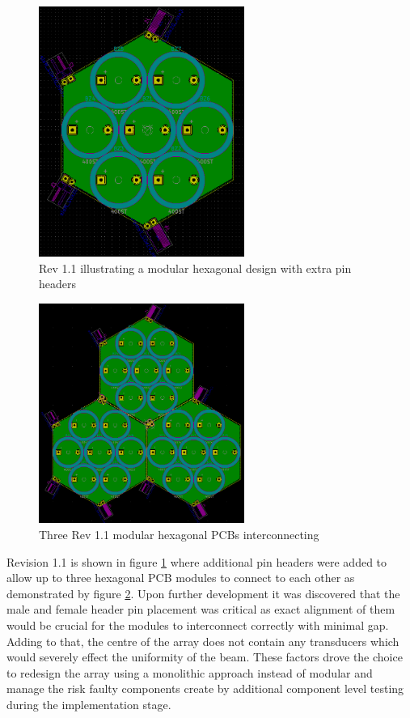 \begin{figure}[ht!]
    \centering
    \includegraphics[width=0.6\textwidth]{Figures/Design/PCB/closeups/hexrev1.1.png}
    \caption{Rev 1.1 illustrating a modular hexagonal design with extra pin headers}
    \label{fig:modHex1.1}
\end{figure}

\begin{figure}[ht!]
    \centering
    \includegraphics[width=0.6\textwidth]{Figures/Design/PCB/closeups/3xhex1.1.png}
    \caption{Three Rev 1.1 modular hexagonal PCBs interconnecting}
    \label{fig:3modHex1.1}
\end{figure}

\newpage
Revision 1.1 is shown in figure \ref{fig:modHex1.1} where additional pin headers were added to allow up to three hexagonal PCB modules to connect to each other as demonstrated by figure \ref{fig:3modHex1.1}. Upon further development it was discovered that the male and female header pin placement was critical as exact alignment of them would be crucial for the modules to interconnect correctly with minimal gap. Adding to that, the centre of the array does not contain any transducers which would severely effect the uniformity of the beam. These factors drove the choice to redesign the array using a monolithic approach instead of modular and manage the risk faulty components create by additional component level testing during the implementation stage.


